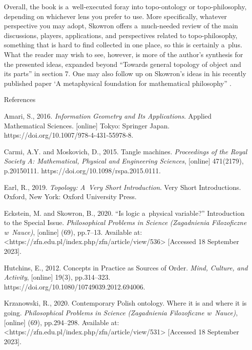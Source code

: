 Overall, the book is a~well-executed foray into topo-ontology or topo-philosophy, depending on whichever lens you prefer to use. More specifically, whatever perspective you may adopt, Skowron offers a~much-needed review of the main discussions, players, applications, and perspectives related to topo-philosophy, something that is hard to find collected in one place, so this is certainly a~plus. What the reader may wish to see, however, is more of the author's synthesis for the presented ideas, expanded beyond ``Towards general topology of object and its parts'' in section 7. One may also follow up on Skowron's ideas in his recently published paper ‘A metaphysical foundation for mathematical philosophy'' 
\parencite[][]{wojtowicz_metaphysical_2022}.%




References



Amari, S., 2016. \textit{Information Geometry and Its Applications}. Applied Mathematical Sciences. [online] Tokyo: Springer Japan. https://doi.org/10.1007/978-4-431-55978-8.



Carmi, A.Y. and Moskovich, D., 2015. Tangle machines. \textit{Proceedings of the Royal Society A: Mathematical, Physical and Engineering Sciences}, [online] 471(2179), p.20150111. https://doi.org/10.1098/rspa.2015.0111.



Earl, R., 2019. \textit{Topology: A~Very Short Introduction}. Very Short Introductions. Oxford, New York: Oxford University Press.



Eckstein, M. and Skowron, B., 2020. ``Is logic a~physical variable?'' Introduction to the Special Issue. \textit{Philosophical Problems in Science (Zagadnienia Filozoficzne w~Nauce)}, [online] (69), pp.7–13. Available at: {\textless}https://zfn.edu.pl/index.php/zfn/article/view/536{\textgreater} [Accessed 18 September 2023].



Hutchins, E., 2012. Concepts in Practice as Sources of Order. \textit{Mind, Culture, and Activity}, [online] 19(3), pp.314–323. https://doi.org/10.1080/10749039.2012.694006.



Krzanowski, R., 2020. Contemporary Polish ontology. Where it is and where it is going. \textit{Philosophical Problems in Science (Zagadnienia Filozoficzne w~Nauce)}, [online] (69), pp.294–298. Available at: {\textless}https://zfn.edu.pl/index.php/zfn/article/view/531{\textgreater} [Accessed 18 September 2023].



